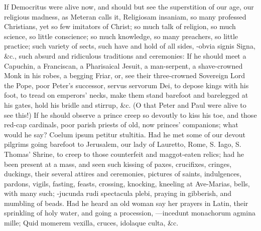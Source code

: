 {If Democritus were alive now, and should but see the superstition of
our age, our religious madness, as Meteran calls it,
Religiosam insaniam, so many professed Christians, yet so few imitators
of Christ; so much talk of religion, so much science, so little
conscience; so much knowledge, so many preachers, so little practice;
such variety of sects, such have and hold of all sides, -obvia
signis Signa, \&c., such absurd and ridiculous traditions and
ceremonies: If he should meet a  Capuchin, a Franciscan, a
Pharisaical Jesuit, a man-serpent, a shave-crowned Monk in his robes, a
begging Friar, or, see their three-crowned Sovereign Lord the Pope,
poor Peter's successor, servus servorum Dei, to depose kings with his
foot, to tread on emperors' necks, make them stand barefoot and
barelegged at his gates, hold his bridle and stirrup, \&c. (O that Peter
and Paul were alive to see this!) If he should observe a prince
creep so devoutly to kiss his toe, and those red-cap cardinals, poor
parish priests of old, now princes' companions; what would he say?
Coelum ipsum petitur stultitia. Had he met some of our devout pilgrims
going barefoot to Jerusalem, our lady of Lauretto, Rome, S. Iago, S.
Thomas' Shrine, to creep to those counterfeit and maggot-eaten relics;
had he been present at a mass, and seen such kissing of paxes,
crucifixes, cringes, duckings, their several attires and ceremonies,
pictures of saints, indulgences, pardons, vigils, fasting, feasts,
crossing, knocking, kneeling at Ave-Marias, bells, with many such;
-jucunda rudi spectacula plebi, praying in gibberish, and mumbling
of beads. Had he heard an old woman say her prayers in Latin, their
sprinkling of holy water, and going a procession,
---incedunt monachorum agmina mille;
Quid momerem vexilla, cruces, idolaque culta, \&c.

}
